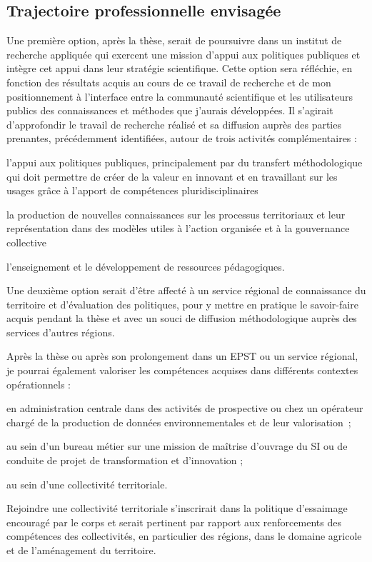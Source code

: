 \subsection
{Trajectoire professionnelle envisagée}

Une première option, après la thèse, serait de poursuivre dans un institut de
recherche appliquée qui exercent une mission d’appui aux politiques publiques
et intègre cet appui dans leur stratégie scientifique. Cette option sera
réfléchie, en fonction des résultats acquis au cours de ce travail de
recherche et de mon positionnement à l’interface entre la communauté
scientifique et les utilisateurs publics des connaissances et méthodes que
j’aurais développées. Il s’agirait d’approfondir le travail de recherche
réalisé et sa diffusion auprès des parties prenantes, précédemment
identifiées, autour de trois activités complémentaires :

\startitemize

\item l'appui aux politiques publiques, principalement par du transfert
méthodologique qui doit permettre de créer de la valeur en innovant et en
travaillant sur les usages grâce à l'apport de compétences pluridisciplinaires

\item la production de nouvelles connaissances sur les processus territoriaux et
leur représentation dans des modèles utiles à l'action organisée et à la
gouvernance collective

\item l'enseignement et le développement de ressources pédagogiques.

\stopitemize

Une deuxième option serait d’être affecté à un service régional de
connaissance du territoire et d'évaluation des politiques, pour y mettre en
pratique le savoir-faire acquis pendant la thèse et avec un souci de diffusion
méthodologique auprès des services d’autres régions.

Après la thèse ou après son prolongement dans un EPST ou un service régional,
je pourrai également valoriser les compétences acquises dans différents
contextes opérationnels :

\startitemize

\item en administration centrale dans des activités de prospective ou chez un
opérateur chargé de la production de données environnementales et de leur
valorisation ;

\item au sein d'un bureau métier sur une mission de maîtrise d'ouvrage du SI ou de
conduite de projet de transformation et d’innovation ;

\item au sein d'une collectivité territoriale.

\stopitemize

Rejoindre une collectivité territoriale s'inscrirait dans la politique
d'essaimage encouragé par le corps et serait pertinent par rapport aux
renforcements des compétences des collectivités, en particulier des régions,
dans le domaine agricole et de l'aménagement du territoire.
